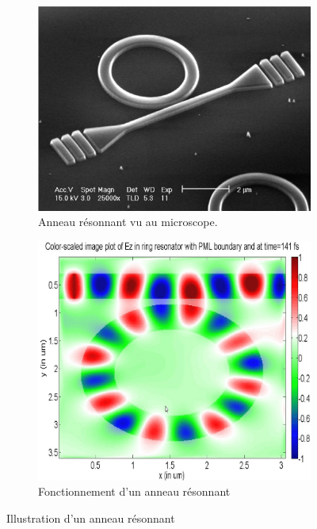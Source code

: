         \begin{figure}[t!]
            \centering
            \begin{subfigure}[t]{0.48\textwidth}
                \centering
                \includegraphics[width=\linewidth]{images/edl_photo_ring1.png}
                \caption{\label{fig:edl_photo_ring1} Anneau résonnant vu au microscope.}
            \end{subfigure}\hfill
            \begin{subfigure}[t]{0.40\textwidth}
                \centering
                \includegraphics[width=\linewidth]{images/edl_photo_ring2.png}
                \caption{\label{fig:edl_photo_ring1} Fonctionnement d'un anneau résonnant}
            \end{subfigure}
            \caption{\label{fig:edl_photo_ring_prez} Illustration d'un anneau résonnant}
        \end{figure}
        
